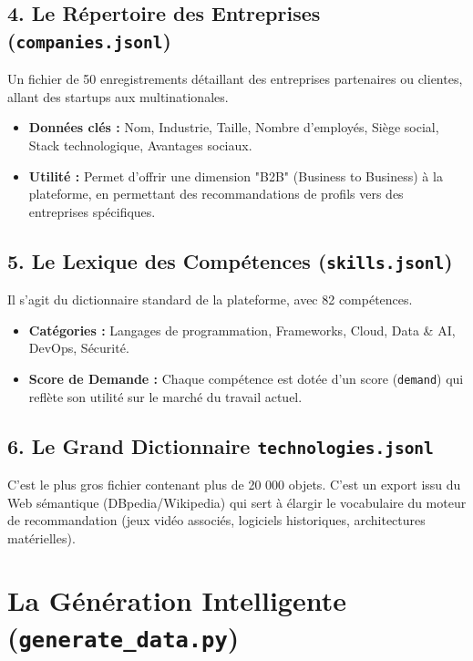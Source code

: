 \documentclass[12pt,a4paper]{article}
\begin{document}
\subsection{4. Le Répertoire des Entreprises (\texttt{companies.jsonl})}
Un fichier de 50 enregistrements détaillant des entreprises partenaires ou clientes, allant des startups aux multinationales.

\begin{itemize}[label=\textcolor{primary}{\textbullet}]
    \item \textbf{Données clés :} Nom, Industrie, Taille, Nombre d'employés, Siège social, Stack technologique, Avantages sociaux.
    \item \textbf{Utilité :} Permet d'offrir une dimension "B2B" (Business to Business) à la plateforme, en permettant des recommandations de profils vers des entreprises spécifiques.
\end{itemize}

\subsection{5. Le Lexique des Compétences (\texttt{skills.jsonl})}
Il s'agit du dictionnaire standard de la plateforme, avec 82 compétences.

\begin{itemize}[label=\textcolor{primary}{\textbullet}]
    \item \textbf{Catégories :} Langages de programmation, Frameworks, Cloud, Data \& AI, DevOps, Sécurité.
    \item \textbf{Score de Demande :} Chaque compétence est dotée d'un score (\texttt{demand}) qui reflète son utilité sur le marché du travail actuel.
\end{itemize}

\subsection{6. Le Grand Dictionnaire \texttt{technologies.jsonl}}
C'est le plus gros fichier contenant plus de 20 000 objets. C'est un export issu du Web sémantique (DBpedia/Wikipedia) qui sert à élargir le vocabulaire du moteur de recommandation (jeux vidéo associés, logiciels historiques, architectures matérielles).

\section{La Génération Intelligente (\texttt{generate\_data.py})}
\end{document}
